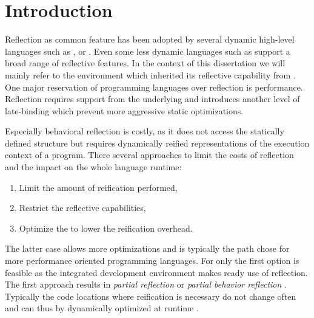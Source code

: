 
\chapter{Introduction}
\minitoc

\noindent Reflection as common feature has been adopted by several dynamic high-level languages such as ,  or .
Even some less dynamic languages such as \Java support a broad range of reflective features.
In the context of this dissertation we will mainly refer to the \PH environment which inherited its reflective capability from \ST.
One major reservation of programming languages over reflection is performance.
Reflection requires support from the underlying \VM and introduces another level of late-binding which prevent more aggressive static optimizations.


Especially behavioral reflection is costly, as it does not access the statically defined structure but requires dynamically reified representations of the execution context of a program.
There several approaches to limit the costs of reflection and the impact on the whole language runtime:
\begin{enumerate}[nolistsep]
	\item Limit the amount of reification performed,
	\item Restrict the reflective capabilities,
	\item Optimize the \VM to lower the reification overhead.
\end{enumerate}
The latter case allows more optimizations and is typically the path chose for more performance oriented programming languages.
For \PH only the first option is feasible as the integrated development environment makes ready use of reflection.
The first approach results in \emph{partial reflection} or \emph{partial behavior reflection} \cite{Tant03a}.
Typically the code locations where reification is necessary do not change often and can thus by dynamically optimized at runtime \cite{Roet07b}.

